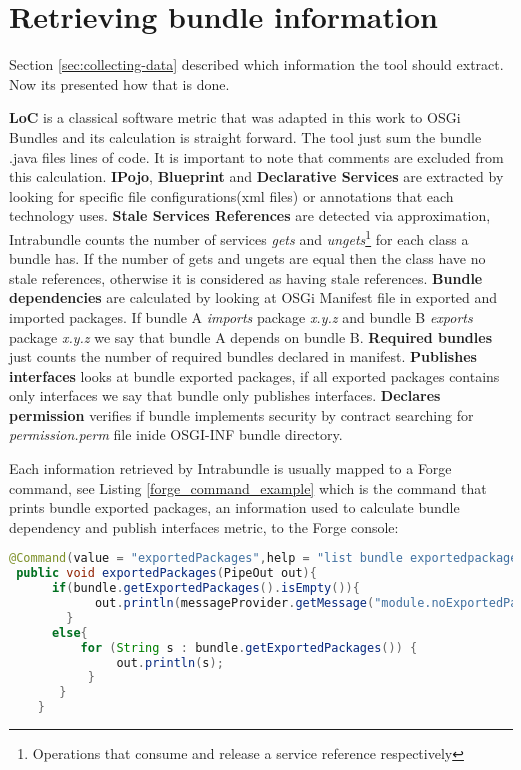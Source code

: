 \section{Retrieving bundle information}
Section \ref{sec:collecting-data} described which information the tool should extract. Now its presented how that is done.


\textbf{LoC} is a classical software metric that was adapted in this work to OSGi Bundles and its calculation is straight forward. The tool just sum the bundle .java files lines of code. It is important to note that comments are excluded from this calculation. 
\textbf{IPojo}, \textbf{Blueprint} and \textbf{Declarative Services} are extracted by looking for specific file configurations(xml files) or annotations that each technology uses.
\textbf{Stale Services References} are detected via approximation, Intrabundle counts the number of services \emph{gets} and \emph{ungets}\footnote{Operations that consume and release a service reference respectively} for each class a bundle has. If the number of gets and ungets are equal then the class have no stale references, otherwise it is considered as having stale references.
\textbf{Bundle dependencies} are calculated by looking at OSGi Manifest file in exported and imported packages. If bundle A \emph{imports} package \emph{x.y.z} and bundle B \emph{exports} package \emph{x.y.z} we say that bundle A depends on bundle B. 
\textbf{Required bundles} just counts the number of required bundles declared in manifest.
\textbf{Publishes interfaces} looks at bundle exported packages, if all exported packages contains only interfaces we say that bundle only publishes interfaces.
\textbf{Declares permission} verifies if bundle implements security by contract searching for \emph{permission.perm} file inide OSGI-INF bundle directory.

Each information retrieved by Intrabundle is usually mapped to a Forge command, see Listing \ref{forge_command_example} which is the command that prints bundle exported packages, an information used to calculate bundle dependency and publish interfaces metric, to the Forge console:
\pagebreak


\begin{lstlisting}[language=java,label=forge_command_example,caption=Exported packages command]
 @Command(value = "exportedPackages",help = "list bundle exportedpackages")
 public void exportedPackages(PipeOut out){
      if(bundle.getExportedPackages().isEmpty()){
            out.println(messageProvider.getMessage("module.noExportedPackages"));
        }
      else{
          for (String s : bundle.getExportedPackages()) {
               out.println(s);
           }
       }
    }
\end{lstlisting}
\FloatBarrier


